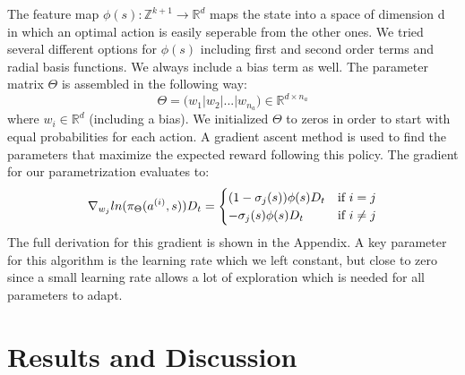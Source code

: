 \documentclass[journal, a4paper]{IEEEtran}
\theoremstyle{plain}
\theoremstyle{definition}
\begin{document}
The feature map $\phi(s): \mathbb{Z}^{k+1} \rightarrow \mathbb{R}^{d}$ maps the state into a space of dimension d in which an optimal action is easily seperable from the other ones. We tried several different options for $\phi(s)$ including first and second order terms and radial basis functions. We always include a bias term as well.
The parameter matrix $\Theta$ is assembled in the following way:
\begin{equation}
	\Theta = \big(w_1|w_2|...|w_{n_a}\big) \in \mathbb{R}^{d \times n_a }
\end{equation}
where $w_i \in \mathbb{R}^{d}$ (including a bias). We initialized $\Theta$ to zeros in order to start with equal probabilities for each action.
\newline
A gradient ascent method is used to find the parameters that maximize the expected reward following this policy. The gradient for our parametrization evaluates to:
\begin{equation}
\notag
\nabla_{w_j} ln(\pi_\Theta(a^{(i)},s))D_t=
	\begin{cases}
     (1-\sigma_j(s)) \phi(s)D_t  & \text{if $i = j$} \\
     -\sigma_j(s)\phi(s)  D_t & \text{if $i \neq  j$} \\ 
    \end{cases}
\end{equation}
The full derivation for this gradient is shown in the Appendix.\newline
A key parameter for this algorithm is the learning rate which we left constant, but close to zero since a small learning rate allows a lot of exploration which is needed for all parameters to adapt. 
\section{Results and Discussion}
\label{sec:results}
\end{document}
